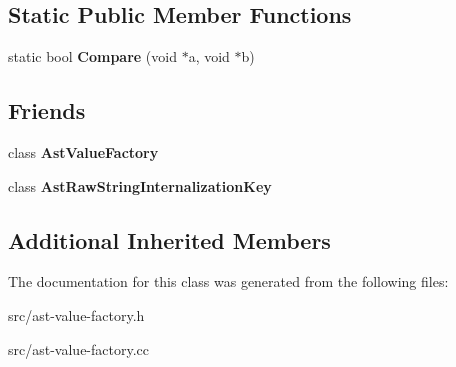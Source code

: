 \subsection*{Static Public Member Functions}
\begin{DoxyCompactItemize}
\item 
\hypertarget{classv8_1_1internal_1_1_ast_raw_string_a963812b8beb8ac3bfad3b87b3a4647b1}{}static bool {\bfseries Compare} (void $\ast$a, void $\ast$b)\label{classv8_1_1internal_1_1_ast_raw_string_a963812b8beb8ac3bfad3b87b3a4647b1}

\end{DoxyCompactItemize}
\subsection*{Friends}
\begin{DoxyCompactItemize}
\item 
\hypertarget{classv8_1_1internal_1_1_ast_raw_string_a1d507e13f196677ce9bdd7b29efd96c0}{}class {\bfseries Ast\+Value\+Factory}\label{classv8_1_1internal_1_1_ast_raw_string_a1d507e13f196677ce9bdd7b29efd96c0}

\item 
\hypertarget{classv8_1_1internal_1_1_ast_raw_string_aa99ea383a648693891f30539a9b5faad}{}class {\bfseries Ast\+Raw\+String\+Internalization\+Key}\label{classv8_1_1internal_1_1_ast_raw_string_aa99ea383a648693891f30539a9b5faad}

\end{DoxyCompactItemize}
\subsection*{Additional Inherited Members}


The documentation for this class was generated from the following files\+:\begin{DoxyCompactItemize}
\item 
src/ast-\/value-\/factory.\+h\item 
src/ast-\/value-\/factory.\+cc\end{DoxyCompactItemize}
